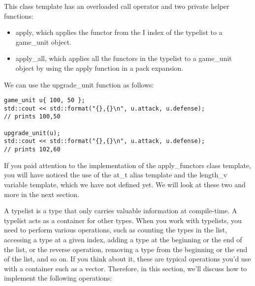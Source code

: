 This class template has an overloaded call operator and two private helper functions:

\begin{itemize}
\item
apply, which applies the functor from the I index of the typelist to a game\_unit object.

\item
apply\_all, which applies all the functors in the typelist to a game\_unit object by using the apply function in a pack expansion.
\end{itemize}

We can use the upgrade\_unit function as follows:

\begin{lstlisting}[style=styleCXX]
game_unit u{ 100, 50 };
std::cout << std::format("{},{}\n", u.attack, u.defense);
// prints 100,50

upgrade_unit(u);
std::cout << std::format("{},{}\n", u.attack, u.defense);
// prints 102,60
\end{lstlisting}

If you paid attention to the implementation of the apply\_functors class template, you will have noticed the use of the at\_t alias template and the length\_v variable template, which we have not defined yet. We will look at these two and more in the next section.


A typelist is a type that only carries valuable information at compile-time. A typelist acts as a container for other types. When you work with typelists, you need to perform various operations, such as counting the types in the list, accessing a type at a given index, adding a type at the beginning or the end of the list, or the reverse operation, removing a type from the beginning or the end of the list, and so on. If you think about it, these are typical operations you’d use with a container such as a vector. Therefore, in this section, we’ll discuss how to implement the following operations:

